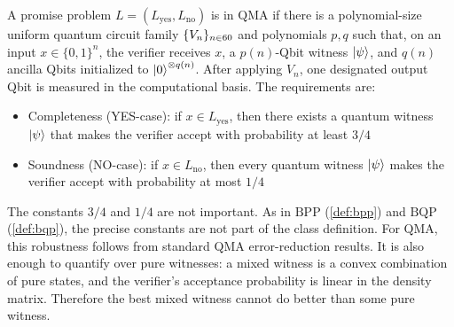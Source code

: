 \begin{definition}\label{def:qma}
A promise problem
\(
L=(L_{\mathrm{yes}},L_{\mathrm{no}})
\)
is in
\(
\mathrm{QMA}
\)
if there is a polynomial-size uniform quantum circuit family
\(
\{V_n\}_{n\in60}
\)
and polynomials
\(
p,q
\)
such that, on an input
\(
x\in\{0,1\}^n
\),
the verifier receives
\(
x
\),
a
\(
p(n)
\)-Qbit witness
\(
\ket{\psi}
\),
and
\(
q(n)
\)
ancilla Qbits initialized to
\(
\ket{0}^{\otimes q(n)}
\).
After applying
\(
V_n
\),
one designated output Qbit is measured in the computational basis.
The requirements are:
\begin{itemize}
\item
Completeness (YES-case): if
\(
x\in L_{\mathrm{yes}}
\),
then there exists a quantum witness
\(
\ket{\psi}
\)
that makes the verifier accept with probability at least
\(
3/4
\)
\item
Soundness (NO-case): if
\(
x\in L_{\mathrm{no}}
\),
then every quantum witness
\(
\ket{\psi}
\)
makes the verifier accept with probability at most
\(
1/4
\)
\qedhere
\end{itemize}
\end{definition}

The constants
\(
3/4
\)
and
\(
1/4
\)
are not important.
As in
\(
\mathrm{BPP}
\) (\autoref{def:bpp})
and
\(
\mathrm{BQP}
\) (\autoref{def:bqp}),
the precise constants are not part of the class definition.
For \(\mathrm{QMA}\), this robustness follows from standard QMA error-reduction results.
It is also enough to quantify over pure witnesses:
a mixed witness is a convex combination of pure states, and the verifier's acceptance probability is linear in the density matrix.
Therefore the best mixed witness cannot do better than some pure witness.

